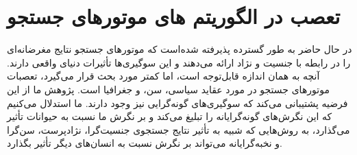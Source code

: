 {
\section*{تعصب در الگوریتم های موتورهای جستجو}
\label{sec:تعصب در الگوریتم های موتورهای جستجو}
در حال حاضر به طور گسترده پذیرفته شده‌است که موتورهای جستجو نتایج مغرضانه‌ای را در رابطه با جنسیت و نژاد ارائه می‌دهند و این سوگیری‌ها تأثیرات دنیای واقعی دارند. آنچه به همان اندازه قابل‌توجه است، اما کمتر مورد بحث قرار می‌گیرد، تعصبات موتورهای جستجو در مورد عقاید سیاسی، سن، و جغرافیا است. پژوهش ما از این فرضیه پشتیبانی می‌کند که سوگیری‌های گونه‌گرایی نیز وجود دارند. ما استدلال می‌کنیم که این نگرش‌های گونه‌گرایانه را تبلیغ می‌کند و بر نگرش ما نسبت به حیوانات تأثیر می‌گذارد، به روش‌هایی که شبیه به تأثیر نتایج جستجوی جنسیت‌گرا، نژادپرست، سن‌گرا و نخبه‌گرایانه می‌تواند بر نگرش نسبت به انسان‌های دیگر تأثیر بگذارد.
}






\begin{figure}
    \centering
    \label{fig:figure}
\end{figure}

